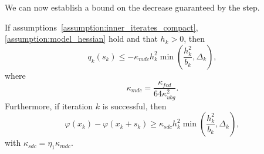 We can now establish a bound on the decrease guaranteed by the step.
\begin{theorem}
	If assumptions~\ref{assumption:inner_iterates_compact}, \ref{assumption:model_hessian} hold and that $h_k > 0$, then
	\begin{equation}\label{eq:bound_step_decrease}
		q_k(s_k) \le -\kappa_{mdc} h_k^2 \min\left(\dfrac{h_k^2}{b_k},\Delta_k\right),
	\end{equation}
	where 
	\begin{equation*}
		\kappa_{mdc} = \dfrac{\kappa_{fcd}}{64\kappa_{ubg}^2}.
	\end{equation*}
	Furthermore, if iteration $k$ is successful, then
	\begin{equation}\label{eq:bound_successful_step_decrease}
		\varphi(x_k) - \varphi(x_k+s_k) \ge \kappa_{sdc} h_k^2 \min\left(\dfrac{h_k^2}{b_k},\Delta_k\right),
	\end{equation}
	with $\kappa_{sdc} = \eta_1 \kappa_{mdc}$.
\end{theorem} 

